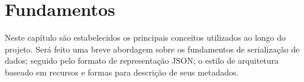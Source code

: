 \chapter{Fundamentos}

Neste capítulo são estabelecidos os principais conceitos utilizados ao longo do projeto. Será feito uma breve abordagem sobre os fundamentos de serialização de dados; seguido pelo formato de representação JSON; o estilo de arquitetura baseado em recursos e formas para descrição de seus metadados.






